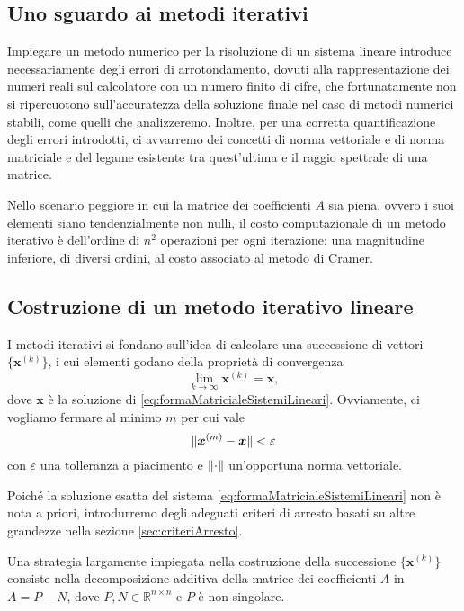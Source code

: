 \subsection{Uno sguardo ai metodi iterativi}
Impiegare un metodo numerico per la risoluzione di un sistema lineare introduce necessariamente degli errori di arrotondamento, dovuti alla rappresentazione 
dei numeri reali sul calcolatore con un numero finito di cifre, che fortunatamente non si ripercuotono sull'accuratezza della soluzione finale nel caso di 
metodi numerici stabili, come quelli che analizzeremo.\newline
Inoltre, per una corretta quantificazione degli errori introdotti, ci avvarremo dei concetti di norma vettoriale e di norma
matriciale e del legame esistente tra quest'ultima e il raggio spettrale di una matrice.

Nello scenario peggiore in cui la matrice dei coefficienti $A$ sia piena, ovvero i suoi elementi siano tendenzialmente non nulli,
il costo computazionale di un metodo iterativo \`e dell'ordine di $n^{2}$ operazioni per ogni iterazione: una magnitudine inferiore, di diversi ordini,
al costo associato al metodo di Cramer.
\subsection{Costruzione di un metodo iterativo lineare}
I metodi iterativi si fondano sull'idea di calcolare una successione di vettori $\{\bm{x}^{(k)}\}$, i cui elementi godano della propriet\`a di convergenza
\begin{equation}
    \label{eq:proprietaConvergenza}
    \lim_{k \to \infty} \bm{x}^{(k)}=\bm{x},
\end{equation}
dove $\bm{x}$ \`e la soluzione di \eqref{eq:formaMatricialeSistemiLineari}. \newline
Ovviamente, ci vogliamo fermare al minimo $m$ per cui vale
\begin{equation*}
    \lVert\bm{x}^{(m)}- \bm{x}\rVert < \varepsilon
\end{equation*}
con $\varepsilon$ una tolleranza a piacimento e $\lVert\cdot\rVert$ un'opportuna norma vettoriale.

Poich\'e la soluzione esatta del sistema \eqref{eq:formaMatricialeSistemiLineari} non \`e nota a priori, introdurremo degli adeguati criteri di arresto basati 
su altre grandezze nella sezione \ref{sec:criteriArresto}.

Una strategia largamente impiegata nella costruzione della successione $\{\bm{x}^{(k)}\}$ consiste nella decomposizione additiva della matrice dei 
coefficienti $A$ in $A=P-N$, dove $P, N\in\mathbb{R}^{n \times n}$ e $P$ \`e non singolare.

